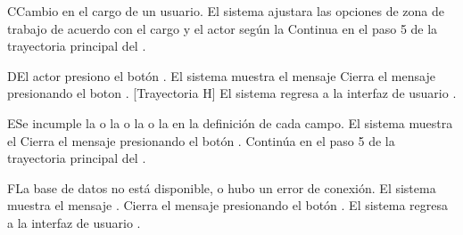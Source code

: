 \begin{UCtrayectoriaA}{C}{Cambio en el cargo de un usuario.}
    \UCpaso     El sistema ajustara las opciones de zona de trabajo de acuerdo con el cargo y el actor según la 
    \UCpaso     Continua en el paso 5 de la trayectoria principal del .
\end{UCtrayectoriaA}


\begin{UCtrayectoriaA}{D}{El actor presiono el botón .}
	\UCpaso El sistema muestra el mensaje 
	\UCpaso[\UCactor] Cierra el mensaje presionando el boton  . [Trayectoria H]
	\UCpaso El sistema regresa a la interfaz de usuario .
\end{UCtrayectoriaA}

\begin{UCtrayectoriaA}{E}{Se incumple la  o la   o la   o la  en la definición de cada campo.}
	\UCpaso El sistema muestra el 
	\UCpaso[\UCactor] Cierra el mensaje presionando el botón .
	\UCpaso Continúa en el paso 5 de la trayectoria principal del .
\end{UCtrayectoriaA}




\begin{UCtrayectoriaA}{F}{La base de datos no está disponible, o hubo un error de conexión.}
    \UCpaso El sistema muestra el mensaje .
    \UCpaso[\UCactor] Cierra el mensaje presionando el botón .
    \UCpaso El sistema regresa a la interfaz de usuario .
\end{UCtrayectoriaA}

